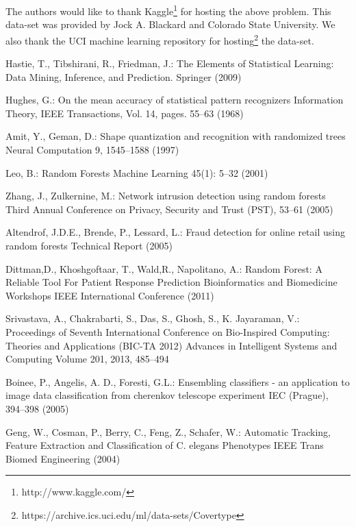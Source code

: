 \documentclass{llncs}
\begin{document}
The authors would like to thank Kaggle\footnote{http://www.kaggle.com/} for hosting the above problem. This data-set was provided by Jock A. Blackard and Colorado State University. We also thank the UCI machine learning repository for hosting\footnote{https://archive.ics.uci.edu/ml/data-sets/Covertype} the data-set\cite{data-set}.



\begin{thebibliography}{5}


Hastie, T., Tibshirani, R., Friedman, J.:
The Elements of Statistical Learning: Data Mining, Inference, and Prediction.
Springer (2009)

Hughes, G.:
On the mean accuracy of statistical pattern recognizers
Information Theory, IEEE Transactions, Vol. 14, pages. 55--63 (1968)

Amit, Y., Geman, D.:
Shape quantization and recognition with randomized trees
Neural Computation 9, 1545--1588 (1997)

Leo, B.:
Random Forests
Machine Learning 45(1): 5--32 (2001)

Zhang, J., Zulkernine, M.: 
Network intrusion detection using random forests 
Third Annual Conference on Privacy, Security and Trust (PST), 53--61 (2005)

Altendrof, J.D.E., Brende, P., Lessard, L.: 
Fraud detection for online retail using random forests
Technical Report (2005)

Dittman,D., Khoshgoftaar, T., Wald,R., Napolitano, A.: 
Random Forest: A Reliable Tool For Patient Response Prediction
Bioinformatics and Biomedicine Workshops IEEE International Conference (2011) 

Srivastava, A., Chakrabarti, S., Das, S., Ghosh, S., K. Jayaraman, V.:
Proceedings of Seventh International Conference on Bio-Inspired Computing: Theories and Applications (BIC-TA 2012)
Advances in Intelligent Systems and Computing Volume 201, 2013, 485--494

Boinee, P., Angelis, A. D., Foresti, G.L.:
Ensembling classifiers - an application to image data classification from cherenkov telescope experiment 
IEC (Prague), 394--398 (2005)

Geng, W., Cosman, P., Berry, C., Feng, Z., Schafer, W.: 
Automatic Tracking, Feature Extraction and Classification of C. elegans Phenotypes 
IEEE Trans Biomed Engineering (2004)


\end{thebibliography}
\end{document}
